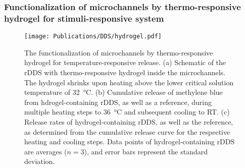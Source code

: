 \subsubsection{Functionalization of microchannels by thermo-responsive hydrogel for stimuli-responsive system}
\begin{figure}[h!]
  \centering
  \texttt{[image: Publications/DDS/hydrogel.pdf]}
  \caption{The functionalization of microchannels by thermo-responsive hydrogel for temperature-responsive release. (a) Schematic of the rDDS with thermo-responsive hydrogel inside the microchannels. The hydrogel shrinks upon heating above the lower critical solution temperature of 32~°C. (b) Cumulative release of methylene blue from hdrogel-containing rDDS, as well as a reference, during multiple heating steps to 36~°C and subsequent cooling to RT. (c) Release rates of hydrogel-containing rDDS, as well as the reference, as determined from the cumulative release curve for the respective heating and cooling steps. Data points of hydrogel-containing rDDS are averages ($n=3$), and error bars represent the standard deviation.}
  \label{fig:hydrogel}
\end{figure}

